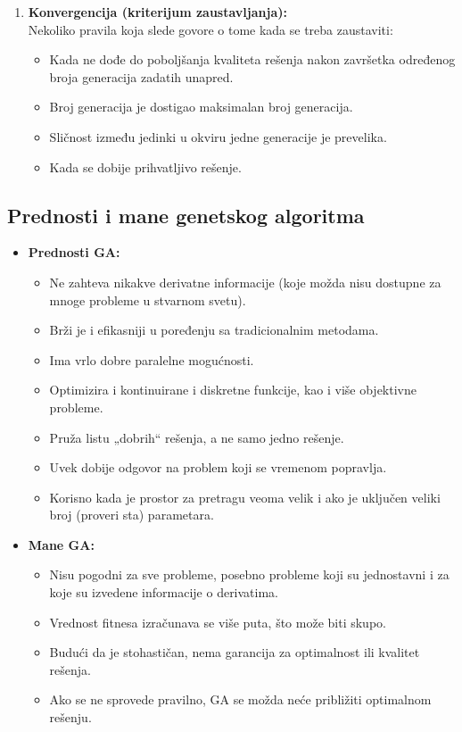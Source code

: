 \documentclass[a4paper]{article}
\begin{document}
\begin{enumerate}
    \item \textbf{Konvergencija (kriterijum zaustavljanja):}\\
    Nekoliko pravila koja slede govore o tome kada se treba zaustaviti:
    \begin{itemize}
	    \item Kada ne dođe do poboljšanja kvaliteta rešenja nakon završetka određenog broja generacija zadatih unapred. 
        \item  Broj generacija je dostigao maksimalan broj generacija.
        \item Sličnost između jedinki u okviru jedne generacije je prevelika.
        \item Kada se dobije prihvatljivo rešenje.

    \end{itemize}
\end{enumerate}

\subsection{Prednosti i mane genetskog algoritma}
\renewcommand\labelitemii{$\square$}
\begin{itemize}
   \item \textbf{Prednosti GA:}
        \begin{itemize}
             \item Ne zahteva nikakve derivatne informacije (koje možda nisu dostupne za mnoge probleme u stvarnom svetu).
             \item Brži je i efikasniji u poređenju sa tradicionalnim metodama. 
             \item Ima vrlo dobre paralelne mogućnosti.
             \item Optimizira i kontinuirane i diskretne funkcije, kao i više objektivne probleme. 
             \item Pruža listu „dobrih“ rešenja, a ne samo jedno rešenje. 
             \item Uvek dobije odgovor na problem koji se vremenom popravlja. 
             \item Korisno kada je prostor za pretragu veoma velik i ako je uključen veliki broj (proveri sta) parametara. 
        \end{itemize}
   \item \textbf{Mane GA:}
        \begin{itemize}
             \item Nisu pogodni za sve probleme, posebno probleme koji su jednostavni i za koje su izvedene informacije o derivatima. 
             \item Vrednost fitnesa izračunava se više puta, što može biti skupo. 
             \item Budući da je stohastičan, nema garancija za optimalnost ili kvalitet rešenja.
             \item Ako se ne sprovede pravilno, GA se možda neće približiti optimalnom rešenju.
        \end{itemize}
   
\end{itemize}
\end{document}
